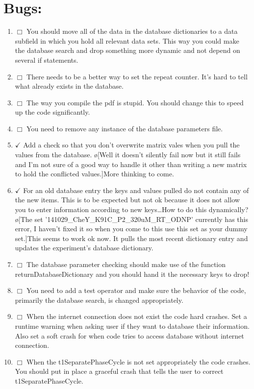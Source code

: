 \documentclass[10pt]{book}
\begin{document}
\section{Bugs:}
\begin{enumerate}
    \item $\Box$ You should move all of the data in the database dictionaries to a data subfield in which you hold all relevant data sets. This way you could make the database search and drop something more dynamic and not depend on several if statements.
    \item $\Box$ There needs to be a better way to set the repeat counter. It's hard to tell what already exists in the database.
    \item $\Box$ The way you compile the pdf is stupid. You should change this to speed up the code significantly.
    \item $\Box$ You need to remove any instance of the database parameters file.
    \item $\checkmark$ Add a check so that you don't overwrite matrix vales when you pull the values from the database. \o[Well it doesn't silently fail now but it still fails and I'm not sure of a good way to handle it other than writing a new matrix to hold the conflicted values.]{More thinking to come.}
    \item $\checkmark$ For an old database entry the keys and values pulled do not contain any of the new items. This is to be expected but not ok because it does not allow you to enter information according to new keys\ldots How to do this dynamically? \o[The set '141029_CheY_K91C_P2_320uM_RT_ODNP' currently has this error, I haven't fixed it so when you come to this use this set as your dummy set.]{This seems to work ok now. It pulls the most recent dictionary entry and updates the experiment's database dictionary.}
    \item $\Box$ The database parameter checking should make use of the function returnDatabaseDictionary and you should hand it the necessary keys to drop!
    \item $\Box$ You need to add a test operator and make sure the behavior of the code, primarily the database search, is changed appropriately.
    \item $\Box$ When the internet connection does not exist the code hard crashes. Set a runtime warning when asking user if they want to database their information. Also set a soft crash for when code tries to access database without internet connection.
    \item $\Box$ When the t1SeparatePhaseCycle is not set appropriately the code crashes. You should put in place a graceful crash that tells the user to correct t1SeparatePhaseCycle.

\end{enumerate}
\end{document}
